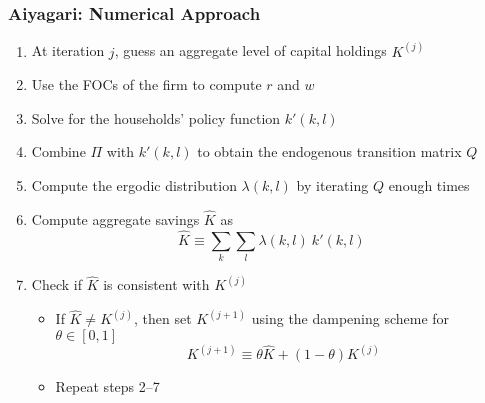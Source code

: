 \documentclass[10pt, aspectratio=1610, natbib, handout]{beamer}
\begin{document}
  \begin{frame}
    \frametitle{Aiyagari: Numerical Approach}

    \begin{enumerate}
      \item At iteration $j$, guess an aggregate level of capital holdings $K^{(j)}$
      \vfill\pause
      \item Use the FOCs of the firm to compute $r$ and $w$
      \vfill\pause
      \item Solve for the households' policy function $k'(k, l)$
      \vfill\pause
      \item Combine $\Pi$ with $k'(k, l)$ to obtain the endogenous transition matrix $Q$
      \vfill\pause
      \item Compute the ergodic distribution $\lambda(k, l)$ by iterating $Q$ enough times
      \vfill\pause
      \item Compute aggregate savings $\hat{K}$ as
        \begin{equation*}
          \hat{K} \equiv \sum_{k} \sum_l \lambda(k, l)\ k'(k, l)
        \end{equation*}
      \vfill\pause
      \item Check if $\hat{K}$ is consistent with $K^{(j)}$
        \begin{itemize}
          \item If $\hat{K} \neq K^{(j)}$, then set $K^{(j+1)}$ using the dampening scheme for $\theta \in [0, 1]$
            \begin{equation*}
              K^{(j+1)} \equiv \theta \hat{K} + (1 - \theta) K^{(j)}
            \end{equation*}
          \item Repeat steps 2--7
        \end{itemize}
    \end{enumerate}

  \end{frame}
\end{document}
